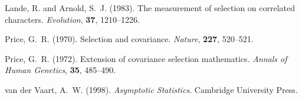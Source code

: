 \documentclass[11pt]{article}
\begin{document}
\begin{thebibliography}{}
Lande, R. and Arnold, S.~J. (1983).
\newblock The measurement of selection on correlated characters.
\newblock \emph{Evolution}, \textbf{37}, 1210--1226.

Price, G.~R. (1970).
\newblock Selection and covariance.
\newblock \emph{Nature}, \textbf{227}, 520--521.

Price, G.~R. (1972).
\newblock Extension of covariance selection mathematics.
\newblock \emph{Annals of Human Genetics}, \textbf{35}, 485--490.

van der Vaart, A.~W. (1998).
\newblock \emph{Asymptotic Statistics}.
\newblock Cambridge University Press.

\end{thebibliography}
\end{document}
